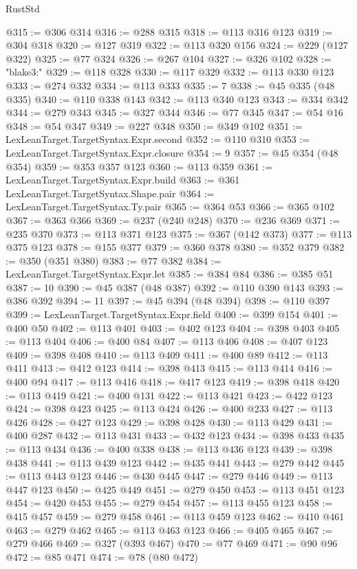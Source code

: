 \begin{lexlean}{RustStd}
\begin{coremodule}
@315 := @306 @314
@316 := @288 @315
@318 := @113 @316 @123
@319 := @304 @318
@320 := @127 @319
@322 := @113 @320 @156
@324 := @229 (@127 @322)
@325 := @77 @324
@326 := @267 @104
@327 := @326 @102
@328 := "blake3:"
@329 := @118 @328
@330 := @117 @329
@332 := @113 @330 @123
@333 := @274 @332
@334 := @113 @333
@335 := 7
@338 := @45 @335 (@48 @335)
@340 := @110 @338 @143
@342 := @113 @340 @123
@343 := @334 @342
@344 := @279 @343
@345 := @327 @344
@346 := @77 @345
@347 := @54 @16
@348 := @54 @347
@349 := @227 @348
@350 := @349 @102
@351 := LexLeanTarget.TargetSyntax.Expr.second
@352 := @110 @310
@353 := LexLeanTarget.TargetSyntax.Expr.closure
@354 := 9
@357 := @45 @354 (@48 @354)
@359 := @353 @357 @123
@360 := @113 @359
@361 := LexLeanTarget.TargetSyntax.Expr.build
@363 := @361 LexLeanTarget.TargetSyntax.Shape.pair
@364 := LexLeanTarget.TargetSyntax.Ty.pair
@365 := @364 @53
@366 := @365 @102
@367 := @363 @366
@369 := @237 (@240 @248)
@370 := @236 @369
@371 := @235 @370
@373 := @113 @371 @123
@375 := @367 (@142 @373)
@377 := @113 @375 @123
@378 := @155 @377
@379 := @360 @378
@380 := @352 @379
@382 := @350 (@351 @380)
@383 := @77 @382
@384 := LexLeanTarget.TargetSyntax.Expr.let
@385 := @384 @84
@386 := @385 @51
@387 := 10
@390 := @45 @387 (@48 @387)
@392 := @110 @390 @143
@393 := @386 @392
@394 := 11
@397 := @45 @394 (@48 @394)
@398 := @110 @397
@399 := LexLeanTarget.TargetSyntax.Expr.field
@400 := @399 @154
@401 := @400 @50
@402 := @113 @401
@403 := @402 @123
@404 := @398 @403
@405 := @113 @404
@406 := @400 @84
@407 := @113 @406
@408 := @407 @123
@409 := @398 @408
@410 := @113 @409
@411 := @400 @89
@412 := @113 @411
@413 := @412 @123
@414 := @398 @413
@415 := @113 @414
@416 := @400 @94
@417 := @113 @416
@418 := @417 @123
@419 := @398 @418
@420 := @113 @419
@421 := @400 @131
@422 := @113 @421
@423 := @422 @123
@424 := @398 @423
@425 := @113 @424
@426 := @400 @233
@427 := @113 @426
@428 := @427 @123
@429 := @398 @428
@430 := @113 @429
@431 := @400 @287
@432 := @113 @431
@433 := @432 @123
@434 := @398 @433
@435 := @113 @434
@436 := @400 @338
@438 := @113 @436 @123
@439 := @398 @438
@441 := @113 @439 @123
@442 := @435 @441
@443 := @279 @442
@445 := @113 @443 @123
@446 := @430 @445
@447 := @279 @446
@449 := @113 @447 @123
@450 := @425 @449
@451 := @279 @450
@453 := @113 @451 @123
@454 := @420 @453
@455 := @279 @454
@457 := @113 @455 @123
@458 := @415 @457
@459 := @279 @458
@461 := @113 @459 @123
@462 := @410 @461
@463 := @279 @462
@465 := @113 @463 @123
@466 := @405 @465
@467 := @279 @466
@469 := @327 (@393 @467)
@470 := @77 @469
@471 := @90 @96
@472 := @85 @471
@474 := @78 (@80 @472)

\end{coremodule}
\end{lexlean}
